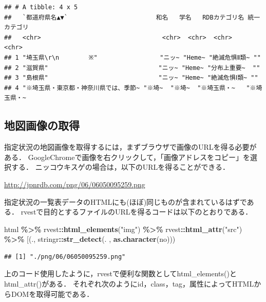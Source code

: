 \documentclass[
]{article}
\newenvironment{Shaded}{\begin{snugshade}}{\end{snugshade}}
\newcommand{\AttributeTok}[1]{\textcolor[rgb]{0.13,0.29,0.53}{#1}}
\newcommand{\FunctionTok}[1]{\textcolor[rgb]{0.13,0.29,0.53}{\textbf{#1}}}
\newcommand{\NormalTok}[1]{#1}
\newcommand{\SpecialCharTok}[1]{\textcolor[rgb]{0.81,0.36,0.00}{\textbf{#1}}}
\newcommand{\StringTok}[1]{\textcolor[rgb]{0.31,0.60,0.02}{#1}}
\begin{document}
\begin{verbatim}
## # A tibble: 4 x 5
##   `都道府県名▲▼`                        和名   学名   RDBカテゴリ名 統一カテゴリ
##   <chr>                                 <chr>  <chr>  <chr>         <chr>       
## 1 "埼玉県\r\n        ※"                 "ニッ~ "Heme~ "絶滅危惧Ⅱ類~ ""          
## 2 "滋賀県"                              "ニッ~ "Heme~ "分布上重要~  ""          
## 3 "島根県"                              "ニッ~ "Heme~ "絶滅危惧Ⅰ類~ ""          
## 4 "※埼玉県・東京都・神奈川県では、季節~ "※埼~  "※埼~  "※埼玉県・~   "※埼玉県・~
\end{verbatim}

\hypertarget{ux5730ux56f3ux753bux50cfux306eux53d6ux5f97}{%
\subsection{地図画像の取得}\label{ux5730ux56f3ux753bux50cfux306eux53d6ux5f97}}

指定状況の地図画像を取得するには，まずブラウザで画像のURLを得る必要がある．
GoogleChromeで画像を右クリックして，「画像アドレスをコピー」を選択する．
ニッコウキスゲの場合は，以下のURLを得ることができる．

\url{http://jpnrdb.com/png/06/06050095259.png}

指定状況の一覧表データのHTMLにも(ほぼ)同じものが含まれているはずである．
rvestで目的とするファイルのURLを得るコードは以下のとおりである．

\begin{Shaded}
\begin{Highlighting}[]
\NormalTok{html }\SpecialCharTok{\%\textgreater{}\%}
\NormalTok{  rvest}\SpecialCharTok{::}\FunctionTok{html\_elements}\NormalTok{(}\StringTok{"img"}\NormalTok{) }\SpecialCharTok{\%\textgreater{}\%}
\NormalTok{  rvest}\SpecialCharTok{::}\FunctionTok{html\_attr}\NormalTok{(}\StringTok{"src"}\NormalTok{) }\SpecialCharTok{\%\textgreater{}\%}
  \StringTok{\textasciigrave{}}\AttributeTok{[}\StringTok{\textasciigrave{}}\NormalTok{(., stringr}\SpecialCharTok{::}\FunctionTok{str\_detect}\NormalTok{(. , }\FunctionTok{as.character}\NormalTok{(no)))}
\end{Highlighting}
\end{Shaded}

\begin{verbatim}
## [1] "./png/06/06050095259.png"
\end{verbatim}

上のコード使用したように，rvestで便利な関数としてhtml\_elements()とhtml\_attr()がある．
それぞれ次のようにid，class，tag，属性によってHTMLからDOMを取得可能である．
\end{document}
